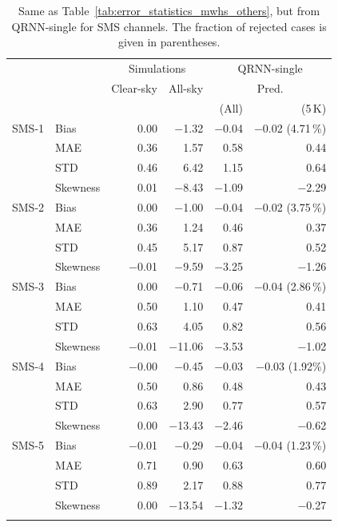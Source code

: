 \documentclass[amt, manuscript]{copernicus}
\begin{document}
\begin{table}[t]
	\caption{Same as Table~\ref{tab:error_statistics_mwhs_others}, but from QRNN-single for SMS channels. The fraction of rejected cases is given in parentheses. }
	\label{tab:statistics_qrnn_sms}
	\begin{tabular}{llrr|rr}
		\tophline
		&&\multicolumn{2}{c|}{Simulations}& \multicolumn{2}{c}{QRNN-single} \\
		\cline{3-6}
		&&Clear-sky &   All-sky &  \multicolumn{2}{c}{Pred.}  \\
		&&   &    &   (All) & (5\,K) \\
		\middlehline
		SMS-1  &Bias     & 0.00 &$-$1.32 &$-$0.04 &$-$0.02 (4.71\,\%) \\
				&MAE      & 0.36 &  1.57 &  0.58 &  0.44 \\
				&STD      & 0.46 &  6.42 &  1.15 &  0.64 \\
				&Skewness & 0.01 &$-$8.43 &$-$1.09 &$-$2.29 \\
		\middlehline
		SMS-2	&Bias     &  0.00 &$-$1.00 &$-$0.04 &$-$0.02 (3.75\,\%)  \\
				&MAE      &  0.36 &  1.24 &  0.46 &  0.37  \\
				&STD      &  0.45 &  5.17 &  0.87 &  0.52  \\
				&Skewness &$-$0.01 &$-$9.59 &$-$3.25 &$-$1.26  \\
		
		\middlehline
		SMS-3	&Bias    &  0.00 & $-$0.71 &$-$0.06 &$-$0.04 (2.86\,\%)  \\
				&MAE      &  0.50 &   1.10 &  0.47 &  0.41  \\
				&STD      &  0.63 &   4.05 &  0.82 &  0.56  \\
				&Skewness &$-$0.01 &$-$11.06 &$-$3.53 &$-$1.02  \\
		\middlehline
		SMS-4	&Bias    &$-$0.00 & $-$0.45 &$-$0.03 &$-$0.03 (1.92\%)  \\
				&MAE      &  0.50 &   0.86 &  0.48 &  0.43  \\
				&STD      &  0.63 &   2.90 &  0.77 &  0.57  \\
				&Skewness &  0.00 &$-$13.43 &$-$2.46 &$-$0.62  \\
		\middlehline
		SMS-5  &Bias    &$-$0.01 & $-$0.29 &$-$0.04 &$-$0.04 (1.23\,\%)  \\
				&MAE      &  0.71 &   0.90 &  0.63 &  0.60  \\
				&STD      &  0.89 &   2.17 &  0.88 &  0.77  \\
				&Skewness &  0.00 &$-$13.54 &$-$1.32 &$-$0.27  \\
		\bottomhline				
	\end{tabular}
	\belowtable{} %
\end{table}
\end{document}
